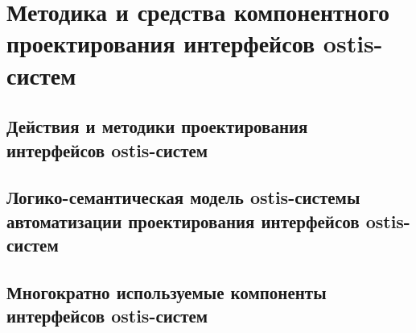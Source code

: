 \chapter{Методика и средства компонентного проектирования интерфейсов ostis-систем}
\label{chapter_ui_design}


\section{Действия и методики проектирования интерфейсов ostis-систем}
\section{Логико-семантическая модель ostis-системы автоматизации проектирования интерфейсов ostis-систем}
\section{Многократно используемые компоненты интерфейсов ostis-систем}

%